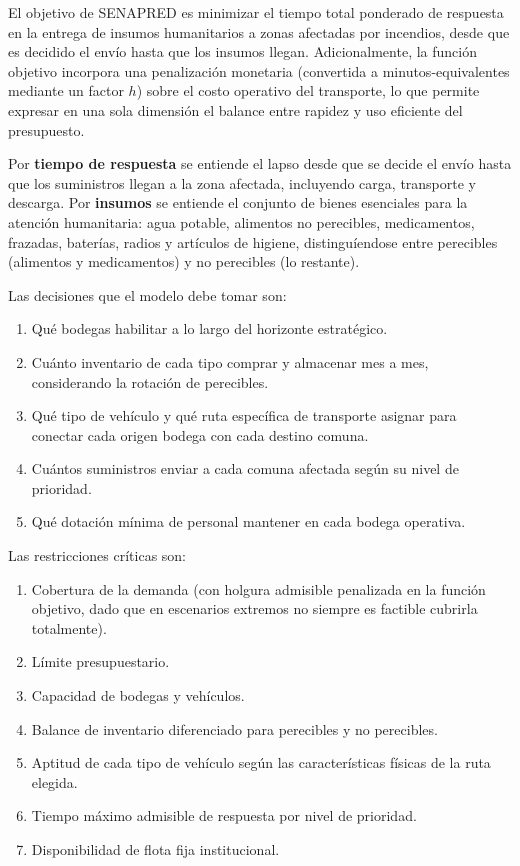 \documentclass[letterpaper]{article}
\begin{document}
\begin{flushleft}
El objetivo de SENAPRED es minimizar el tiempo total ponderado de respuesta en la entrega de insumos humanitarios a zonas afectadas por incendios, desde que es decidido el env\'io hasta que los insumos llegan. Adicionalmente, la funci\'on objetivo incorpora una penalizaci\'on monetaria (convertida a minutos-equivalentes mediante un factor $h$) sobre el costo operativo del transporte, lo que permite expresar en una sola dimensi\'on el balance entre rapidez y uso eficiente del presupuesto.

Por \textbf{tiempo de respuesta} se entiende el lapso desde que se decide el env\'io hasta que los suministros llegan a la zona afectada, incluyendo carga, transporte y descarga. Por \textbf{insumos} se entiende el conjunto de bienes esenciales para la atenci\'on humanitaria: agua potable, alimentos no perecibles, medicamentos, frazadas, bater\'ias, radios y art\'iculos de higiene, distingu\'iendose entre perecibles (alimentos y medicamentos) y no perecibles (lo restante).

Las decisiones que el modelo debe tomar son:
\begin{enumerate}[leftmargin=2em, itemsep=2pt]
  \item Qu\'e bodegas habilitar a lo largo del horizonte estrat\'egico.
  \item Cu\'anto inventario de cada tipo comprar y almacenar mes a mes, considerando la rotaci\'on de perecibles.
  \item Qu\'e tipo de veh\'iculo y qu\'e ruta espec\'ifica de transporte asignar para conectar cada origen bodega con cada destino comuna.
  \item Cu\'antos suministros enviar a cada comuna afectada seg\'un su nivel de prioridad.
  \item Qu\'e dotaci\'on m\'inima de personal mantener en cada bodega operativa.
\end{enumerate}

Las restricciones cr\'iticas son:
\begin{enumerate}[leftmargin=2em, itemsep=2pt]
  \item Cobertura de la demanda (con holgura admisible penalizada en la funci\'on objetivo, dado que en escenarios extremos no siempre es factible cubrirla totalmente).
  \item L\'imite presupuestario.
  \item Capacidad de bodegas y veh\'iculos.
  \item Balance de inventario diferenciado para perecibles y no perecibles.
  \item Aptitud de cada tipo de veh\'iculo seg\'un las caracter\'isticas f\'isicas de la ruta elegida.
  \item Tiempo m\'aximo admisible de respuesta por nivel de prioridad.
  \item Disponibilidad de flota fija institucional.
\end{enumerate}


\end{flushleft}
\end{document}
